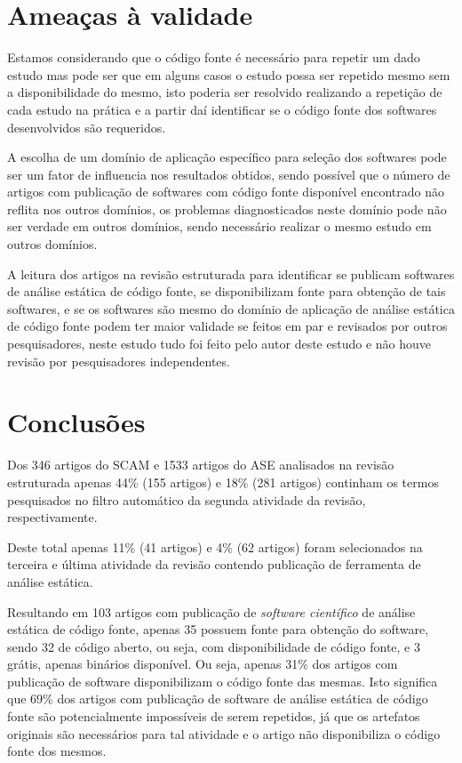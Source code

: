 \section{Ameaças à validade}

Estamos considerando que o código fonte é necessário para repetir um dado
estudo mas pode ser que em alguns casos o estudo possa ser repetido mesmo sem a
disponibilidade do mesmo, isto poderia ser resolvido realizando a repetição
de cada estudo na prática e a partir daí identificar se o código fonte dos
softwares desenvolvidos são requeridos.

A escolha de um domínio de aplicação específico para seleção dos softwares
pode ser um fator de influencia nos resultados obtidos, sendo possível que
o número de artigos com publicação de softwares com código fonte disponível
encontrado não reflita nos outros domínios, os problemas diagnosticados
neste domínio pode não ser verdade em outros domínios, sendo necessário
realizar o mesmo estudo em outros domínios.

A leitura dos artigos na revisão estruturada para identificar se publicam
softwares de análise estática de código fonte, se disponibilizam fonte para
obtenção de tais softwares, e se os softwares são mesmo do domínio de aplicação
de análise estática de código fonte podem ter maior validade se feitos em
par e revisados por outros pesquisadores, neste estudo tudo foi feito pelo
autor deste estudo e não houve revisão por pesquisadores independentes.

\section{Conclusões}

Dos 346 artigos do SCAM e 1533 artigos do ASE analisados na revisão estruturada
apenas 44\% (155 artigos) e 18\% (281 artigos) continham os termos pesquisados
no filtro automático da segunda atividade da revisão, respectivamente.

Deste total apenas 11\% (41 artigos) e 4\% (62 artigos) foram selecionados na
terceira e última atividade da revisão contendo publicação de ferramenta de
análise estática.

Resultando em 103 artigos com publicação de {\it software científico} de
análise estática de código fonte, apenas 35 possuem fonte para obtenção do
software, sendo 32 de código aberto, ou seja, com disponibilidade de
código fonte, e 3 grátis, apenas binários disponível. Ou seja, apenas 31\% dos
artigos com publicação de software disponibilizam o código fonte das mesmas.
Isto significa que 69\% dos artigos com publicação de software de análise
estática de código fonte são potencialmente impossíveis de serem repetidos, já
que os artefatos originais são necessários para tal atividade e o artigo não
disponibiliza o código fonte dos mesmos.

